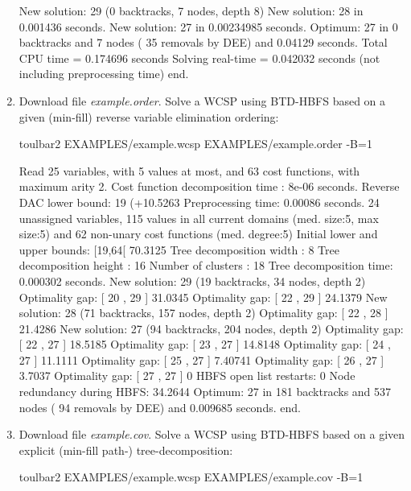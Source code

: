 \begin{enumerate}
{\begin{DoxyCode}
New solution: 29 (0 backtracks, 7 nodes, depth 8)
New solution: 28 in 0.001436 seconds.
New solution: 27 in 0.00234985 seconds.
Optimum: 27 in 0 backtracks and 7 nodes ( 35 removals by DEE) and 0.04129 seconds.
Total CPU time = 0.174696 seconds
Solving real-time = 0.042032 seconds (not including preprocessing time)
end.
\end{DoxyCode}}
\item Download file {\em example.order}. Solve a WCSP using BTD-HBFS based on a given (min-fill) reverse variable elimination ordering:
\begin{DoxyCode}
	toulbar2 EXAMPLES/example.wcsp EXAMPLES/example.order -B=1
\end{DoxyCode}
{\scriptsize
\begin{DoxyCode}
Read 25 variables, with 5 values at most, and 63 cost functions, with maximum arity 2.
Cost function decomposition time : 8e-06 seconds.
Reverse DAC lower bound: 19 (+10.5263%
Preprocessing time: 0.00086 seconds.
24 unassigned variables, 115 values in all current domains (med. size:5, max size:5) and 62 non-unary cost functions (med. degree:5)
Initial lower and upper bounds: [19,64[ 70.3125%
Tree decomposition width  : 8
Tree decomposition height : 16
Number of clusters        : 18
Tree decomposition time: 0.000302 seconds.
New solution: 29 (19 backtracks, 34 nodes, depth 2)
Optimality gap: [ 20 , 29 ] 31.0345 %
Optimality gap: [ 22 , 29 ] 24.1379 %
New solution: 28 (71 backtracks, 157 nodes, depth 2)
Optimality gap: [ 22 , 28 ] 21.4286 %
New solution: 27 (94 backtracks, 204 nodes, depth 2)
Optimality gap: [ 22 , 27 ] 18.5185 %
Optimality gap: [ 23 , 27 ] 14.8148 %
Optimality gap: [ 24 , 27 ] 11.1111 %
Optimality gap: [ 25 , 27 ] 7.40741 %
Optimality gap: [ 26 , 27 ] 3.7037 %
Optimality gap: [ 27 , 27 ] 0 %
HBFS open list restarts: 0 %
Node redundancy during HBFS: 34.2644 %
Optimum: 27 in 181 backtracks and 537 nodes ( 94 removals by DEE) and 0.009685 seconds.
end.
\end{DoxyCode}}
\item Download file {\em example.cov}. Solve a WCSP using BTD-HBFS based on a given explicit (min-fill path-) tree-decomposition:
\begin{DoxyCode}
	toulbar2 EXAMPLES/example.wcsp EXAMPLES/example.cov -B=1
\end{DoxyCode}

\end{enumerate}

